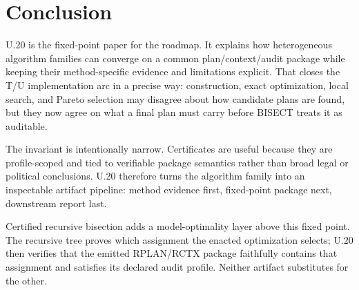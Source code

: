 \section{Conclusion}

U.20 is the fixed-point paper for the roadmap. It explains how heterogeneous
algorithm families can converge on a common plan/context/audit package while
keeping their method-specific evidence and limitations explicit. That closes
the T/U implementation arc in a precise way: construction, exact optimization,
local search, and Pareto selection may disagree about how candidate plans are
found, but they now agree on what a final plan must carry before BISECT treats
it as auditable.

The invariant is intentionally narrow. Certificates are useful because they are
profile-scoped and tied to verifiable package semantics rather than broad legal
or political conclusions. U.20 therefore turns the algorithm family into an
inspectable artifact pipeline: method evidence first, fixed-point package next,
downstream report last.

Certified recursive bisection adds a model-optimality layer above this fixed
point. The recursive tree proves which assignment the enacted optimization
selects; U.20 then verifies that the emitted RPLAN/RCTX package faithfully
contains that assignment and satisfies its declared audit profile. Neither
artifact substitutes for the other.
